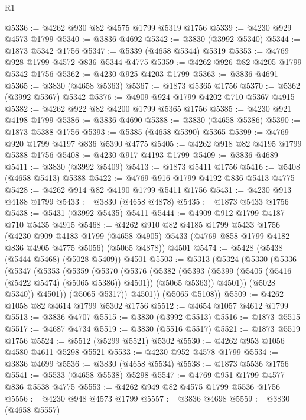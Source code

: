 \begin{lexlean}{R1}
\begin{coremodule}
@5336 := @4262 @930 @82 @4575 @1799 @5319 @1756
@5339 := @4230 @929 @4573 @1799
@5340 := @3836 @4692
@5342 := @3830 (@3992 @5340)
@5344 := @1873 @5342 @1756
@5347 := @5339 (@4658 @5344) @5319
@5353 := @4769 @928 @1799 @4572 @836 @5344 @4775
@5359 := @4262 @926 @82 @4205 @1799 @5342 @1756
@5362 := @4230 @925 @4203 @1799
@5363 := @3836 @4691
@5365 := @3830 (@4658 @5363)
@5367 := @1873 @5365 @1756
@5370 := @5362 (@3992 @5367) @5342
@5376 := @4909 @924 @1799 @4202 @710 @5367 @4915
@5382 := @4262 @922 @82 @4200 @1799 @5365 @1756
@5385 := @4230 @921 @4198 @1799
@5386 := @3836 @4690
@5388 := @3830 (@4658 @5386)
@5390 := @1873 @5388 @1756
@5393 := @5385 (@4658 @5390) @5365
@5399 := @4769 @920 @1799 @4197 @836 @5390 @4775
@5405 := @4262 @918 @82 @4195 @1799 @5388 @1756
@5408 := @4230 @917 @4193 @1799
@5409 := @3836 @4689
@5411 := @3830 (@3992 @5409)
@5413 := @1873 @5411 @1756
@5416 := @5408 (@4658 @5413) @5388
@5422 := @4769 @916 @1799 @4192 @836 @5413 @4775
@5428 := @4262 @914 @82 @4190 @1799 @5411 @1756
@5431 := @4230 @913 @4188 @1799
@5433 := @3830 (@4658 @4878)
@5435 := @1873 @5433 @1756
@5438 := @5431 (@3992 @5435) @5411
@5444 := @4909 @912 @1799 @4187 @710 @5435 @4915
@5468 := @4262
    @910
    @82
    @4185
    @1799
    @5433
    @1756
    (@4230
      @909
      @4183
      @1799
      (@4658 @4905)
      @5433
      (@4769 @858 @1799 @4182 @836 @4905 @4775 @5056)
      (@5065 @4878))
    @4501
@5474 := @5428 (@5438 (@5444 @5468) (@5028 @5409)) @4501
@5503 := @5313
    (@5324
      (@5330
        (@5336
          (@5347
            (@5353
              (@5359
                (@5370
                  (@5376
                    (@5382
                      (@5393
                        (@5399 (@5405 (@5416 (@5422 @5474) (@5065 @5386)) @4501))
                        (@5065 @5363))
                      @4501))
                  (@5028 @5340))
                @4501))
            (@5065 @5317))
          @4501))
      (@5065 @5108))
@5509 := @4262 @1058 @82 @4614 @1799 @5302 @1756
@5512 := @4654 @1057 @4612 @1799
@5513 := @3836 @4707
@5515 := @3830 (@3992 @5513)
@5516 := @1873 @5515
@5517 := @4687 @4734
@5519 := @3830 (@5516 @5517)
@5521 := @1873 @5519 @1756
@5524 := @5512 (@5299 @5521) @5302
@5530 := @4262 @953 @1056 @4580 @4611 @5298 @5521
@5533 := @4230 @952 @4578 @1799
@5534 := @3836 @4699
@5536 := @3830 (@4658 @5534)
@5538 := @1873 @5536 @1756
@5541 := @5533 (@4658 @5538) @5298
@5547 := @4769 @951 @1799 @4577 @836 @5538 @4775
@5553 := @4262 @949 @82 @4575 @1799 @5536 @1756
@5556 := @4230 @948 @4573 @1799
@5557 := @3836 @4698
@5559 := @3830 (@4658 @5557)

\end{coremodule}
\end{lexlean}
